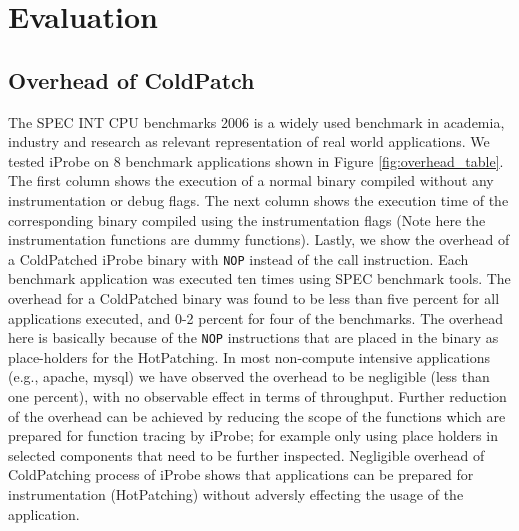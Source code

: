 
\section{Evaluation}
\label{sec:eval}


\subsection{Overhead of ColdPatch}
The SPEC INT CPU benchmarks 2006 \cite{specCPU2006} is a widely used benchmark in academia, industry and research as relevant representation of real world applications. 
We tested iProbe on 8 benchmark applications shown in Figure \ref{fig:overhead_table}. The first column shows the execution of a normal binary compiled without any instrumentation or debug flags. 
The next column shows the execution time of the corresponding binary compiled using the instrumentation flags (Note here the instrumentation functions are dummy functions). 
Lastly, we show the overhead of a ColdPatched iProbe binary with \texttt{NOP} instead of the call instruction. 
Each benchmark application was executed ten times using SPEC benchmark tools. 
The overhead for a ColdPatched binary was found to be less than five percent for all applications executed, and 0-2 percent for four of the benchmarks. 
The overhead here is basically because of the \texttt{NOP} instructions that are placed in the binary as place-holders for the HotPatching. 
In most non-compute intensive applications (e.g., apache, mysql) we have observed the overhead to be negligible (less than one percent), with no observable effect in terms of throughput. 
Further reduction of the overhead can be achieved by reducing the scope of the functions which are prepared for function tracing by iProbe; for example only using place holders in selected components that need to be further inspected. 
Negligible overhead of ColdPatching process of iProbe shows that applications can be prepared for instrumentation (HotPatching) without adversly effecting the usage of the application.

